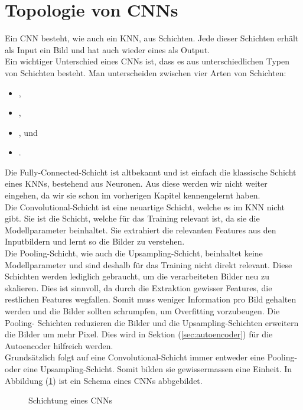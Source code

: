 \cite{deeplearning.ai:cnn}
\cite{wiki:tensor}

\section{Topologie von CNNs}
Ein CNN besteht, wie auch ein KNN, aus Schichten. Jede dieser Schichten erhält
als Input ein Bild und hat auch wieder eines als Output. \\
Ein wichtiger Unterschied eines CNNs ist, dass es aus unterschiedlichen Typen von
Schichten besteht. Man unterscheiden zwischen vier Arten von Schichten:
\begin{itemize}
\item{,}
\item{,}
\item{, und}
\item{.}
\end{itemize}
Die Fully-Connected-Schicht ist altbekannt und ist einfach die klassische Schicht
eines KNNs, bestehend aus Neuronen. Aus diese werden wir nicht weiter eingehen,
da wir sie schon im vorherigen Kapitel kennengelernt haben. \\
Die Convolutional-Schicht ist eine neuartige Schicht, welche es im KNN nicht
gibt. Sie ist die Schicht, welche für das Training relevant ist,
da sie die Modellparameter beinhaltet. Sie extrahiert die relevanten Features
aus den Inputbildern und lernt so die Bilder zu verstehen. \\
Die Pooling-Schicht, wie auch die Upsampling-Schicht, beinhaltet keine
Modellparameter und sind deshalb für das Training nicht direkt relevant.
Diese Schichten werden lediglich gebraucht, um die verarbeiteten Bilder neu zu
skalieren. Dies ist sinnvoll, da durch die Extraktion gewisser Features, die
restlichen Features wegfallen. Somit muss weniger Information pro Bild gehalten
werden und die Bilder sollten schrumpfen, um Overfitting vorzubeugen. Die Pooling-
Schichten reduzieren die Bilder und die Upsampling-Schichten erweitern die
Bilder um mehr Pixel. Dies wird in Sektion (\ref{sec:autoencoder}) für die Autoencoder
hilfreich werden. \\
Grundsätzlich folgt auf eine Convolutional-Schicht immer entweder eine Pooling-
oder eine Upsampling-Schicht. Somit bilden sie gewissermassen eine Einheit.
\para{}
In Abbildung (\ref{fig:cnn_topology}) ist ein Schema eines CNNs abbgebildet.
\begin{figure}[h!]

  \caption{Schichtung eines CNNs}
  \label{fig:cnn_topology}
\end{figure}

